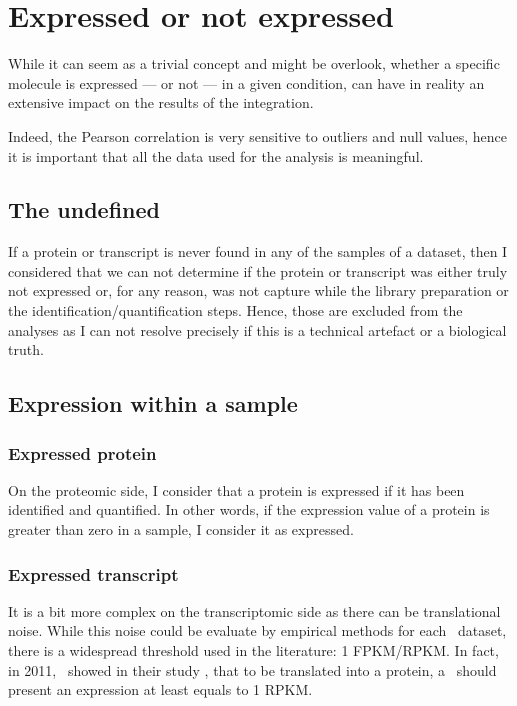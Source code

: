 \section{Expressed or not expressed}
\label{sec:IntegrationExpressedOrNot}

While it can seem as a trivial concept and might be overlook, whether a specific
molecule is expressed --- or not --- in a given condition, can have in reality
an extensive impact on the results of the integration.

Indeed, the Pearson correlation is very sensitive to outliers and null values,
hence it is important that all the data used for the analysis is meaningful.

\subsection{The undefined}
\label{subsec:IntegrationExpressedOrNot-undefined}
If a protein or transcript is never found in any of the samples of a dataset,
then I considered that we can not determine if the protein or transcript was either
truly not expressed or, for any reason, was not capture while the library
preparation or the identification/quantification steps. Hence, those are
excluded from the analyses as I can not resolve precisely if this is a
technical artefact or a biological truth.

\subsection{Expression within a sample}

\subsubsection{Expressed protein}
On the proteomic side, I consider that a protein is expressed if it has been
identified and quantified. In other words, if the expression value of a protein
is greater than zero in a sample, I consider it as expressed.

\subsubsection{Expressed transcript}
It is a bit more complex on the transcriptomic side as there can be
translational noise. While this noise could be evaluate by empirical methods for
each \Rnaseq\ dataset, there is a widespread threshold used in the literature:
1 \gls{FPKM}/\gls{RPKM}. In fact, in 2011,~\cite{Hebenstreit:2011} showed in
their study , that to be translated into a protein, a \mRNA\ should
present an expression at least equals to 1 \gls{RPKM}.

